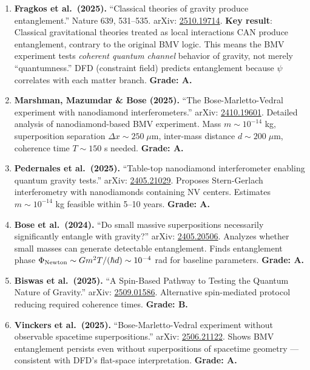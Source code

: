 \documentclass[11pt,a4paper]{article}
\begin{document}
\begin{enumerate}
\item \textbf{Fragkos et al.\ (2025).} ``Classical theories of gravity produce entanglement.'' Nature 639, 531--535. arXiv: \href{https://arxiv.org/abs/2510.19714}{2510.19714}. \textbf{Key result}: Classical gravitational theories treated as local interactions CAN produce entanglement, contrary to the original BMV logic. This means the BMV experiment tests \emph{coherent quantum channel} behavior of gravity, not merely ``quantumness.'' DFD (constraint field) predicts entanglement because $\psi$ correlates with each matter branch. \textbf{Grade: A.}

\item \textbf{Marshman, Mazumdar \& Bose (2025).} ``The Bose-Marletto-Vedral experiment with nanodiamond interferometers.'' arXiv: \href{https://arxiv.org/abs/2410.19601}{2410.19601}. Detailed analysis of nanodiamond-based BMV experiment. Mass $m \sim 10^{-14}$ kg, superposition separation $\Delta x \sim 250\;\mu$m, inter-mass distance $d \sim 200\;\mu$m, coherence time $T \sim 150$ s needed. \textbf{Grade: A.}

\item \textbf{Pedernales et al.\ (2025).} ``Table-top nanodiamond interferometer enabling quantum gravity tests.'' arXiv: \href{https://arxiv.org/abs/2405.21029}{2405.21029}. Proposes Stern-Gerlach interferometry with nanodiamonds containing NV centers. Estimates $m \sim 10^{-14}$ kg feasible within 5--10 years. \textbf{Grade: A.}

\item \textbf{Bose et al.\ (2024).} ``Do small massive superpositions necessarily significantly entangle with gravity?'' arXiv: \href{https://arxiv.org/abs/2405.20506}{2405.20506}. Analyzes whether small masses can generate detectable entanglement. Finds entanglement phase $\Phi_{\rm Newton} \sim Gm^2T/(\hbar d) \sim 10^{-4}$ rad for baseline parameters. \textbf{Grade: A.}

\item \textbf{Biswas et al.\ (2025).} ``A Spin-Based Pathway to Testing the Quantum Nature of Gravity.'' arXiv: \href{https://arxiv.org/abs/2509.01586}{2509.01586}. Alternative spin-mediated protocol reducing required coherence times. \textbf{Grade: B.}

\item \textbf{Vinckers et al.\ (2025).} ``Bose-Marletto-Vedral experiment without observable spacetime superpositions.'' arXiv: \href{https://arxiv.org/abs/2506.21122}{2506.21122}. Shows BMV entanglement persists even without superpositions of spacetime geometry --- consistent with DFD's flat-space interpretation. \textbf{Grade: A.}
\end{enumerate}
\end{document}
